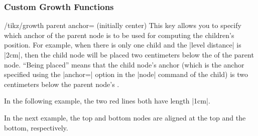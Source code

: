 \subsubsection{Custom Growth Functions}

\begin{key}{/tikz/growth parent anchor= (initially center)}
    This key allows you to specify which anchor of the parent node is to be
    used for computing the children's position. For example, when there is only
    one child and the |level distance| is |2cm|, then the child node will be
    placed two centimeters below the  of the parent node. ``Being
    placed'' means that the child node's anchor (which is the anchor specified
    using the |anchor=| option in the |node| command of the child) is two
    centimeters below the parent node's .

    In the following example, the two red lines both have length |1cm|.
\begin{codeexample}[]
\end{codeexample}

    In the next example, the top and bottom nodes are aligned at the top and
    the bottom, respectively.
\begin{codeexample}[]
\end{codeexample}
\end{key}

